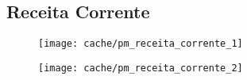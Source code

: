 
\subsection{Receita Corrente}





\begin{figure}[H]
\center
\texttt{[image: cache/pm\_receita\_corrente\_1]}
\end{figure}

\begin{figure}[H]
\center
\texttt{[image: cache/pm\_receita\_corrente\_2]}
\end{figure}
